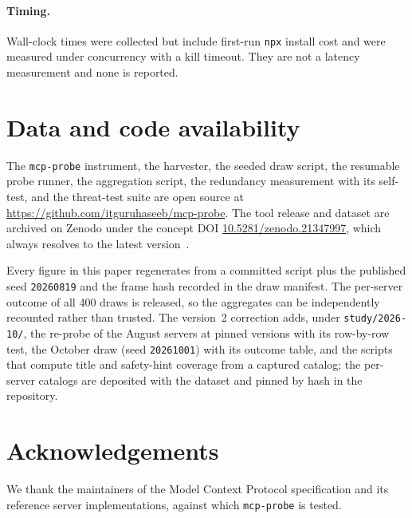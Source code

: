 \documentclass[11pt]{article}
\begin{document}
\paragraph{Timing.}
Wall-clock times were collected but include first-run \texttt{npx} install cost
and were measured under concurrency with a kill timeout. They are not a latency
measurement and none is reported.

\section{Data and code availability}
\label{sec:data}

The \texttt{mcp-probe} instrument, the harvester, the seeded draw script, the
resumable probe runner, the aggregation script, the redundancy measurement with
its self-test, and the threat-test suite are open source at
\url{https://github.com/itguruhaseeb/mcp-probe}. The tool release and dataset are
archived on Zenodo under the concept DOI
\href{https://doi.org/10.5281/zenodo.21347997}{10.5281/zenodo.21347997}, which
always resolves to the latest version~\cite{mcpprobe_dataset}.

Every figure in this paper regenerates from a committed script plus the published
seed \texttt{20260819} and the frame hash recorded in the draw manifest. The
per-server outcome of all 400 draws is released, so the aggregates can be
independently recounted rather than trusted. The version~2 correction adds, under
\texttt{study/2026-10/}, the re-probe of the August servers at pinned versions
with its row-by-row test, the October draw (seed \texttt{20261001}) with its
outcome table, and the scripts that compute title and safety-hint coverage from a
captured catalog; the per-server catalogs are deposited with the dataset and
pinned by hash in the repository.

\section*{Acknowledgements}
We thank the maintainers of the Model Context Protocol specification and its
reference server implementations, against which \texttt{mcp-probe} is tested.
\end{document}
